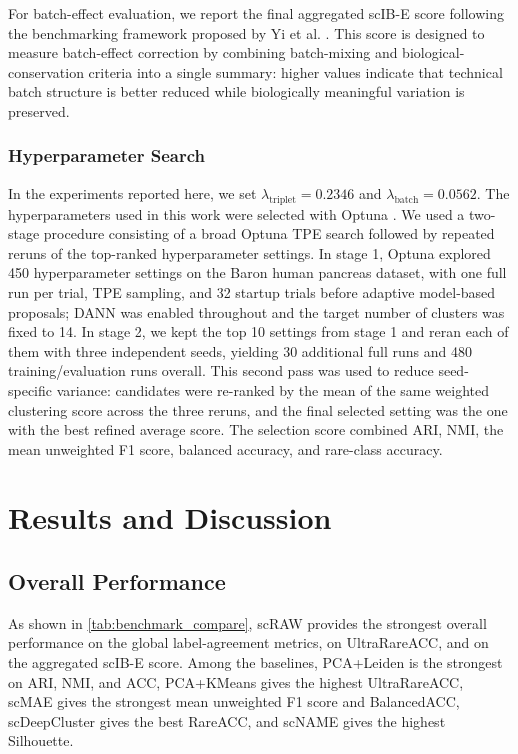 \documentclass[11pt,a4paper]{article}
\begin{document}
For batch-effect evaluation, we report the final aggregated scIB-E score following the benchmarking framework proposed by Yi et al. \cite{yi2025}. This score is designed to measure batch-effect correction by combining batch-mixing and biological-conservation criteria into a single summary: higher values indicate that technical batch structure is better reduced while biologically meaningful variation is preserved.


\subsubsection*{Hyperparameter Search}
In the experiments reported
here, we set $\lambda_{\mathrm{triplet}} = 0.2346$ and
$\lambda_{\mathrm{batch}} = 0.0562$.
The hyperparameters used in this work were selected with Optuna
\cite{akiba2019}.
We used a two-stage procedure consisting of a broad Optuna TPE search followed by repeated reruns of the top-ranked hyperparameter settings. In stage 1, Optuna explored 450 hyperparameter settings on the Baron human pancreas dataset, with one full run per trial, TPE sampling, and 32 startup trials before adaptive model-based proposals; DANN was enabled throughout and the target number of clusters was fixed to 14. In stage 2, we kept the top 10 settings from stage 1 and reran each of them with three independent seeds, yielding 30 additional full runs and 480 training/evaluation runs overall. This second pass was used to reduce seed-specific variance: candidates were re-ranked by the mean of the same weighted clustering score across the three reruns, and the final selected setting was the one with the best refined average score. The selection score combined ARI, NMI, the mean unweighted F1 score, balanced accuracy, and rare-class accuracy.


\section{Results and Discussion}

\subsection{Overall Performance}

As shown in \autoref{tab:benchmark_compare}, scRAW provides the strongest overall performance on the global label-agreement metrics, on UltraRareACC, and on the aggregated scIB-E score. Among the baselines, PCA+Leiden is the strongest on ARI, NMI, and ACC, PCA+KMeans gives the highest UltraRareACC, scMAE gives the strongest mean unweighted F1 score and BalancedACC, scDeepCluster gives the best RareACC, and scNAME gives the highest Silhouette.
\end{document}
